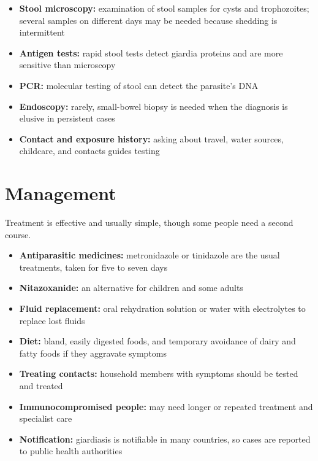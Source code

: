 \begin{itemize}
    \item \textbf{Stool microscopy:} examination of stool samples for cysts and trophozoites; several samples on different days may be needed because shedding is intermittent
    \item \textbf{Antigen tests:} rapid stool tests detect giardia proteins and are more sensitive than microscopy
    \item \textbf{PCR:} molecular testing of stool can detect the parasite's DNA
    \item \textbf{Endoscopy:} rarely, small-bowel biopsy is needed when the diagnosis is elusive in persistent cases
    \item \textbf{Contact and exposure history:} asking about travel, water sources, childcare, and contacts guides testing
\end{itemize}

\section*{Management}
Treatment is effective and usually simple, though some people need a second course.

\begin{itemize}
    \item \textbf{Antiparasitic medicines:} metronidazole or tinidazole are the usual treatments, taken for five to seven days
    \item \textbf{Nitazoxanide:} an alternative for children and some adults
    \item \textbf{Fluid replacement:} oral rehydration solution or water with electrolytes to replace lost fluids
    \item \textbf{Diet:} bland, easily digested foods, and temporary avoidance of dairy and fatty foods if they aggravate symptoms
    \item \textbf{Treating contacts:} household members with symptoms should be tested and treated
    \item \textbf{Immunocompromised people:} may need longer or repeated treatment and specialist care
    \item \textbf{Notification:} giardiasis is notifiable in many countries, so cases are reported to public health authorities
\end{itemize}

